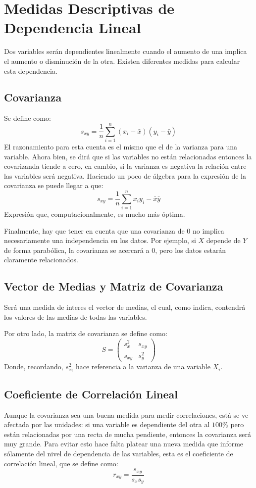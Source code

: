 \documentclass[10pt,a4paper]{book}
\begin{document}
\section{Medidas Descriptivas de Dependencia Lineal}
Dos variables serán dependientes linealmente cuando el aumento de una implica el aumento o disminución de la otra. Existen diferentes medidas para calcular esta dependencia.
\subsection{Covarianza}
Se define como:
\[s_{xy} = \frac1{n}\sum_{i=1}^n(x_i-\bar{x})(y_i-\bar{y})\]
El razonamiento para esta cuenta es el mismo que el de la varianza para una variable. Ahora bien, se dirá que si las variables no están relacionadas entonces la covarizanda tiende a cero, en cambio, si la varianza es negativa la relación entre las variables será negativa. Haciendo un poco de álgebra para la expresión de la covarianza se puede llegar a que:
\[s_{xy} = \frac1{n}\sum_{i=1}^nx_iy_i-\bar{x}\bar{y}\]
Expresión que, computacionalmente, es mucho más óptima.

Finalmente, hay que tener en cuenta que una covarianza de 0 no implica necesariamente una independencia en los datos. Por ejemplo, si $X$ depende de $Y$ de forma parabólica, la covarianza se acercará a 0, pero los datos estarán claramente relacionados.

\subsection{Vector de Medias y Matriz de Covarianza}
Será una medida de interes el vector de medias, el cual, como indica, contendrá los valores de las medias de todas las variables.

Por otro lado, la matriz de covarianza se define como:
\[S=\begin{pmatrix}
	s_x^2 & s_{xy}\\s_{xy} & s_y^2
\end{pmatrix}\]
Donde, recordando, $s_{x_i}^2$ hace referencia a la varianza de una variable $X_i$.
	
\subsection{Coeficiente de Correlación Lineal}
Aunque la covarianza sea una buena medida para medir correlaciones, está se ve afectada por las unidades: si una variable es dependiente del otra al $100\%$ pero están relacionadas por una recta de mucha pendiente, entonces la covarianza será muy grande. Para evitar esto hace falta platear una nueva medida que informe sólamente del nivel de dependencia de las variables, esta es el coeficiente de correlación lineal, que se define como:
\[r_{xy} = \frac{s_{xy}}{s_xs_y}\]
\end{document}
